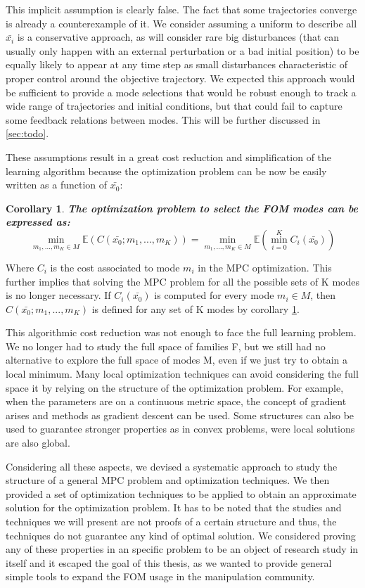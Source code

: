 \documentclass[12,twoside]{TFG-GM}
\newtheorem{corollary}[theorem]{Corollary}
\theoremstyle{definition}
\theoremstyle{remark}
\newcommand*\diff[1]{\bar{#1}}
\begin{document}
This implicit assumption is clearly false. The fact that some trajectories converge is already a counterexample of it. We consider assuming a uniform to describe all $\diff{x_i}$ is a conservative approach, as will consider rare big disturbances (that can usually only happen with an external perturbation or a bad initial position) to be equally likely to appear at any time step as small disturbances characteristic of proper control around the objective trajectory. We expected this approach would be sufficient to provide a mode selections that would be robust enough to track a wide range of trajectories and initial conditions, but that could fail to capture some feedback relations between modes. This will be further discussed in \ref{sec:todo}.

These assumptions result in a great cost reduction and simplification of the learning algorithm because the optimization problem can be now be easily written as a function of $\diff{x_0}$:
\begin{corollary} \textbf{The optimization problem to select the FOM modes can be expressed as:} \label{cor:costfunction} 
 $$\min\limits_{m_1, ..., m_K \in M}\mathbb{E}(C(\diff{x_0}; m_1, ..., m_K)) = \min\limits_{m_1, ..., m_K \in M}\mathbb{E}(\min\limits_{i = 0}^{K}{C_i(\diff{x_0})})$$
 
\end{corollary}
Where $C_i$ is the cost associated to mode $m_i$ in the MPC optimization. This further implies that solving the MPC problem for all the possible sets of K modes is no longer necessary. If $C_i(\diff{x_0})$ is computed for every mode $m_i \in M$, then $C(\diff{x_0}; m_1, ..., m_K)$ is defined for any set of K modes by corollary \ref{cor:costfunction}.

This algorithmic cost reduction was not enough to face the full learning problem. We no longer had to study the full space of families F, but we still had no alternative to explore the full space of modes M, even if we just try to obtain a local minimum. Many local optimization techniques can avoid considering the full space it by relying on the structure of the optimization problem. For example, when the parameters are on a continuous metric space, the concept of gradient arises and methods as gradient descent can be used. Some structures can also be used to guarantee stronger properties as in convex problems, were local solutions are also global.

Considering all these aspects, we devised a systematic approach to study the structure of a general MPC problem and optimization techniques. We then provided a set of optimization techniques to be applied to obtain an approximate solution for the optimization problem. It has to be noted that the studies and techniques we will present are not proofs of a certain structure and thus, the techniques do not guarantee any kind of optimal solution. We considered proving any of these properties in an specific problem to be an object of research study in itself and it escaped the goal of this thesis, as we wanted to provide general simple tools to expand the FOM usage in the manipulation community.
\end{document}

